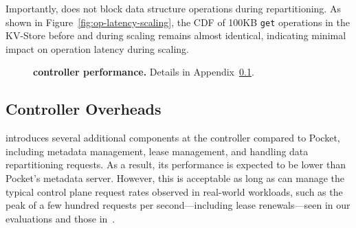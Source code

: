 Importantly, \jiffy does not block data structure operations during repartitioning. As shown in Figure~\ref{fig:op-latency-scaling}, the CDF of 100KB \texttt{get} operations in the KV-Store before and during scaling remains almost identical, indicating minimal impact on operation latency during scaling.


\begin{figure}[h]
  \centering
  \caption[\jiffy controller performance]{{\textbf{\jiffy controller performance.} Details in Appendix~\ref{ssec:controller-scale}.}}
  \label{fig:controller-perf}
\end{figure}

\subsection{Controller Overheads}
\label{ssec:controller-scale}

\jiffy introduces several additional components at the controller compared to Pocket, including metadata management, lease management, and handling data repartitioning requests. As a result, its performance is expected to be lower than Pocket's metadata server. However, this is acceptable as long as \jiffy can manage the typical control plane request rates observed in real-world workloads, such as the peak of a few hundred requests per second—including lease renewals—seen in our evaluations and those in~\cite{pocket}.

